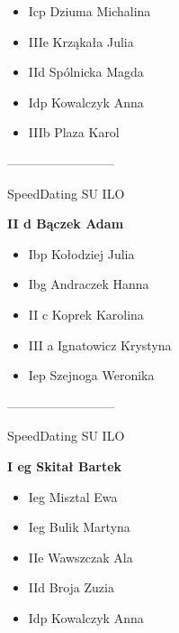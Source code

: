 \documentclass[a4paper,10pt]{article}
\begin{document}
\begin{multicols}{3}
\begin{minipage}[l]{\textwidth}
  \begin{itemize}
    \item Icp Dziuma Michalina
    \item IIIe Krząkała Julia
    \item IId  Spólnicka Magda
    \item Idp Kowalczyk Anna
    \item IIIb Plaza Karol

    \end{itemize}



\end{minipage}



\begin{minipage}[l]{\textwidth}
--------------------------

  \footnotesize{SpeedDating SU ILO}

  \bfseries{II d Bączek Adam}

  \begin{itemize}
    \item Ibp Kołodziej Julia
    \item Ibg Andraczek Hanna
    \item II c Koprek Karolina
    \item III a Ignatowicz Krystyna
    \item Iep Szejnoga Weronika

    \end{itemize}



\end{minipage}



\begin{minipage}[l]{\textwidth}
--------------------------

  \footnotesize{SpeedDating SU ILO}

  \bfseries{I eg Skitał Bartek}

  \begin{itemize}
    \item Ieg Misztal Ewa
    \item Ieg Bulik Martyna
    \item IIe Wawszczak Ala
    \item IId Broja Zuzia
    \item Idp Kowalczyk Anna

    \end{itemize}




\end{minipage}
\end{multicols}
\end{document}
